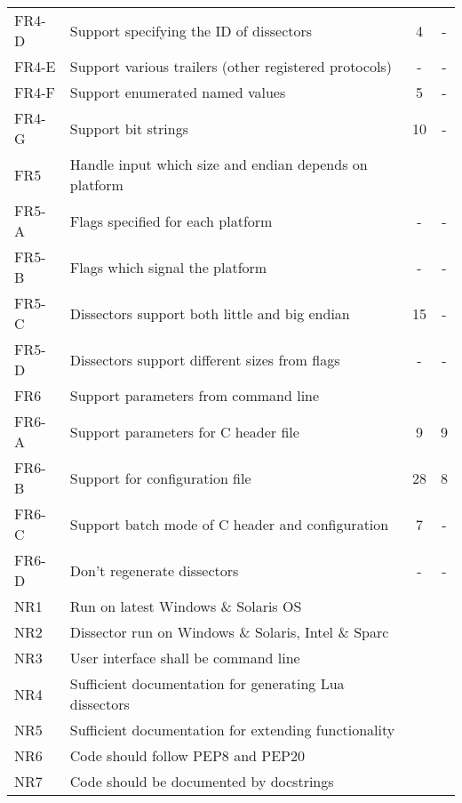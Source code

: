 \begin{table}[ht]
\begin{tabularx}{\textwidth}{l X c c}
	FR4-D & Support specifying the ID of dissectors & 4 & - \\
	FR4-E & Support various trailers (other registered protocols) & - & - \\
	FR4-F & Support enumerated named values  & 5 & - \\
	FR4-G & Support bit strings & 10 & - \\
	\addlinespace
	FR5 & Handle input which size and endian depends on platform & & \\
	FR5-A & Flags specified for each platform & - & - \\
	FR5-B & Flags which signal the platform & - & - \\
	FR5-C & Dissectors support both little and big endian & 15 & - \\
	FR5-D & Dissectors support different sizes from flags & - & - \\	
	\addlinespace
	FR6 & Support parameters from command line & & \\
	FR6-A & Support parameters for C header file & 9 & 9 \\
	FR6-B & Support for configuration file & 28 & 8 \\
	FR6-C & Support batch mode of C header and configuration & 7 & - \\
	FR6-D & Don't regenerate dissectors & - & - \\
	\addlinespace
	NR1 & Run on latest Windows \& Solaris OS & & \\
	NR2 & Dissector run on Windows \& Solaris, Intel \& Sparc & & \\
	NR3 & User interface shall be command line & & \\
	NR4 & Sufficient documentation for generating Lua dissectors & & \\
	NR5 & Sufficient documentation for extending functionality & & \\
	NR6 & Code should follow PEP8 and PEP20 & & \\
	NR7 & Code should be documented by docstrings & & \\
	\bottomrule
\end{tabularx}
\end{table}

